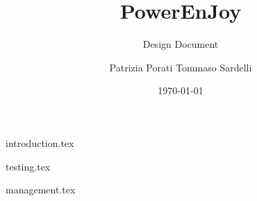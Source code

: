\documentclass{beamer}
\author{Patrizia Porati \newline Tommaso Sardelli}
\title{PowerEnJoy}
\subtitle{Design Document}
\institute{Politecnico di Milano}
\date{\today}
\begin{document}
{introduction.tex}



{testing.tex}

{management.tex}
\end{document}
